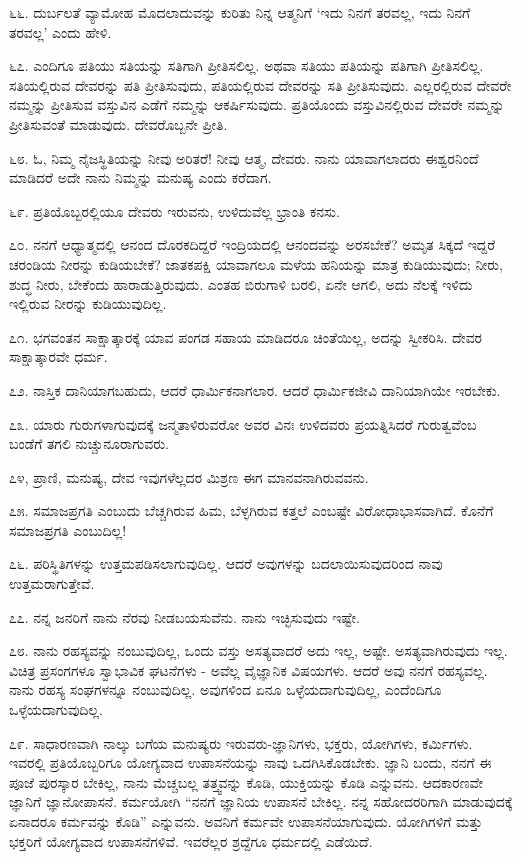 ೬೬. ದುರ್ಬಲತೆ ವ್ಯಾಮೋಹ ಮೊದಲಾದುವನ್ನು ಕುರಿತು ನಿನ್ನ ಆತ್ಮನಿಗೆ ‘ಇದು ನಿನಗೆ ತರವಲ್ಲ, ಇದು ನಿನಗೆ ತರವಲ್ಲ’ ಎಂದು ಹೇಳಿ.

೬೭. ಎಂದಿಗೂ ಪತಿಯು ಸತಿಯನ್ನು ಸತಿಗಾಗಿ ಪ್ರೀತಿಸಲಿಲ್ಲ. ಅಥವಾ ಸತಿಯು ಪತಿಯನ್ನು ಪತಿಗಾಗಿ ಪ್ರೀತಿಸಲಿಲ್ಲ. ಸತಿಯಲ್ಲಿರುವ ದೇವರನ್ನು ಪತಿ ಪ್ರೀತಿಸುವುದು, ಪತಿಯಲ್ಲಿರುವ ದೇವರನ್ನು ಸತಿ ಪ್ರೀತಿಸುವುದು. ಎಲ್ಲರಲ್ಲಿರುವ ದೇವರೇ ನಮ್ಮನ್ನು ಪ್ರೀತಿಸುವ ವಸ್ತುವಿನ ಎಡೆಗೆ ನಮ್ಮನ್ನು ಆಕರ್ಷಿಸುವುದು. ಪ್ರತಿಯೊಂದು ವಸ್ತುವಿನಲ್ಲಿರುವ ದೇವರೇ ನಮ್ಮನ್ನು ಪ್ರೀತಿಸುವಂತೆ ಮಾಡುವುದು. ದೇವರೊಬ್ಬನೇ ಪ್ರೀತಿ.

೬೮. ಓ, ನಿಮ್ಮ ನೈಜಸ್ಥಿತಿಯನ್ನು ನೀವು ಅರಿತರೆ! ನೀವು ಆತ್ಮ, ದೇವರು. ನಾನು ಯಾವಾಗಲಾದರು ಈಶ್ವರನಿಂದೆ ಮಾಡಿದರೆ ಅದೇ ನಾನು ನಿಮ್ಮನ್ನು ಮನುಷ್ಯ ಎಂದು ಕರೆದಾಗ.

೬೯. ಪ್ರತಿಯೊಬ್ಬರಲ್ಲಿಯೂ ದೇವರು ಇರುವನು, ಉಳಿದುವೆಲ್ಲ ಭ್ರಾಂತಿ ಕನಸು.

೭೦. ನನಗೆ ಆಧ್ಯಾತ್ಮದಲ್ಲಿ ಆನಂದ ದೊರಕದಿದ್ದರೆ ಇಂದ್ರಿಯದಲ್ಲಿ ಆನಂದವನ್ನು ಅರಸಬೇಕೆ? ಅಮೃತ ಸಿಕ್ಕದೆ ಇದ್ದರೆ ಚರಂಡಿಯ ನೀರನ್ನು ಕುಡಿಯಬೇಕೆ? ಜಾತಕಪಕ್ಷಿ ಯಾವಾಗಲೂ ಮಳೆಯ ಹನಿಯನ್ನು ಮಾತ್ರ ಕುಡಿಯುವುದು; ನೀರು, ಶುದ್ಧ ನೀರು, ಬೇಕೆಂದು ಹಾರಾಡುತ್ತಿರುವುದು. ಎಂತಹ ಬಿರುಗಾಳಿ ಬರಲಿ, ಏನೇ ಆಗಲಿ, ಅದು ನೆಲಕ್ಕೆ ಇಳಿದು ಇಲ್ಲಿರುವ ನೀರನ್ನು ಕುಡಿಯುವುದಿಲ್ಲ.

೭೧. ಭಗವಂತನ ಸಾಕ್ಷಾತ್ಕಾರಕ್ಕೆ ಯಾವ ಪಂಗಡ ಸಹಾಯ ಮಾಡಿದರೂ ಚಿಂತೆಯಿಲ್ಲ, ಅದನ್ನು ಸ್ವೀಕರಿಸಿ. ದೇವರ ಸಾಕ್ಷಾತ್ಕಾರವೇ ಧರ್ಮ.

೭೨. ನಾಸ್ತಿಕ ದಾನಿಯಾಗಬಹುದು, ಆದರೆ ಧಾರ್ಮಿಕನಾಗಲಾರ. ಆದರೆ ಧಾರ್ಮಿಕಜೀವಿ ದಾನಿಯಾಗಿಯೇ ಇರಬೇಕು.

೭೩. ಯಾರು ಗುರುಗಳಾಗುವುದಕ್ಕೆ ಜನ್ಮತಾಳಿರುವರೋ ಅವರ ವಿನಃ ಉಳಿದವರು ಪ್ರಯತ್ನಿಸಿದರೆ ಗುರುತ್ವವೆಂಬ ಬಂಡೆಗೆ ತಗಲಿ ನುಚ್ಚುನೂರಾಗುವರು.

೭೪, ಪ್ರಾಣಿ, ಮನುಷ್ಯ, ದೇವ ಇವುಗಳೆಲ್ಲದರ ಮಿಶ್ರಣ ಈಗ ಮಾನವನಾಗಿರುವವನು.

೭೫. ಸಮಾಜಪ್ರಗತಿ ಎಂಬುದು ಬೆಚ್ಚಗಿರುವ ಹಿಮ, ಬೆಳ್ಳಗಿರುವ ಕತ್ತಲೆ ಎಂಬಷ್ಟೇ ವಿರೋಧಾಭಾಸವಾಗಿದೆ. ಕೊನೆಗೆ ಸಮಾಜಪ್ರಗತಿ ಎಂಬುದಿಲ್ಲ!

೭೬. ಪರಿಸ್ಥಿತಿಗಳನ್ನು ಉತ್ತಮಪಡಿಸಲಾಗುವುದಿಲ್ಲ. ಆದರೆ ಅವುಗಳನ್ನು ಬದಲಾಯಿಸುವುದರಿಂದ ನಾವು ಉತ್ತಮರಾಗುತ್ತೇವೆ.

೭೭. ನನ್ನ ಜನರಿಗೆ ನಾನು ನೆರವು ನೀಡಬಯಸುವೆನು. ನಾನು ಇಚ್ಛಿಸುವುದು ಇಷ್ಟೇ.

೭೮. ನಾನು ರಹಸ್ಯವನ್ನು ನಂಬುವುದಿಲ್ಲ, ಒಂದು ವಸ್ತು ಅಸತ್ಯವಾದರೆ ಅದು ಇಲ್ಲ, ಅಷ್ಟೇ. ಅಸತ್ಯವಾಗಿರುವುದು ಇಲ್ಲ. ವಿಚಿತ್ರ ಪ್ರಸಂಗಗಳೂ ಸ್ವಾಭಾವಿಕ ಘಟನೆಗಳು - ಅವೆಲ್ಲ ವೈಜ್ಞಾನಿಕ ವಿಷಯಗಳು. ಆದರೆ ಅವು ನನಗೆ ರಹಸ್ಯವಲ್ಲ. ನಾನು ರಹಸ್ಯ ಸಂಘಗಳನ್ನೂ ನಂಬುವುದಿಲ್ಲ. ಅವುಗಳಿಂದ ಏನೂ ಒಳ್ಳೆಯದಾಗುವುದಿಲ್ಲ, ಎಂದೆಂದಿಗೂ ಒಳ್ಳೆಯದಾಗುವುದಿಲ್ಲ.

೭೯. ಸಾಧಾರಣವಾಗಿ ನಾಲ್ಕು ಬಗೆಯ ಮನುಷ್ಯರು ಇರುವರು-ಜ್ಞಾನಿಗಳು, ಭಕ್ತರು, ಯೋಗಿಗಳು, ಕರ್ಮಿಗಳು. ಇವರಲ್ಲಿ ಪ್ರತಿಯೊಬ್ಬರಿಗೂ ಯೋಗ್ಯವಾದ ಉಪಾಸನೆಯನ್ನು ನಾವು ಒದಗಿಸಿಕೊಡಬೇಕು. ಜ್ಞಾನಿ ಬಂದು, ನನಗೆ ಈ ಪೂಜೆ ಪುರಸ್ಕಾರ ಬೇಕಿಲ್ಲ, ನಾನು ಮೆಚ್ಚಬಲ್ಲ ತತ್ತ್ವವನ್ನು ಕೊಡಿ, ಯುಕ್ತಿಯನ್ನು ಕೊಡಿ ಎನ್ನುವನು. ಆದಕಾರಣವೇ ಜ್ಞಾನಿಗೆ ಜ್ಞಾನೋಪಾಸನೆ. ಕರ್ಮಯೋಗಿ “ನನಗೆ ಜ್ಞಾನಿಯ ಉಪಾಸನೆ ಬೇಕಿಲ್ಲ. ನನ್ನ ಸಹೋದರರಿಗಾಗಿ ಮಾಡುವುದಕ್ಕೆ ಏನಾದರೂ ಕರ್ಮವನ್ನು ಕೊಡಿ” ಎನ್ನುವನು. ಅವನಿಗೆ ಕರ್ಮವೇ ಉಪಾಸನೆಯಾಗುವುದು. ಯೋಗಿಗಳಿಗೆ ಮತ್ತು ಭಕ್ತರಿಗೆ ಯೋಗ್ಯವಾದ ಉಪಾಸನೆಗಳಿವೆ. ಇವರೆಲ್ಲರ ಶ್ರದ್ದೆಗೂ ಧರ್ಮದಲ್ಲಿ ಎಡೆಯಿದೆ.

